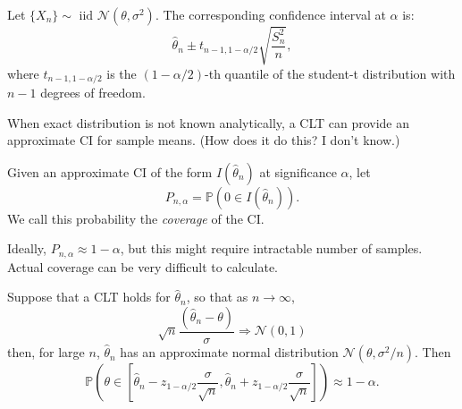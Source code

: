 \documentclass{article}
\newcommand\Prob[1]{\mathbb P(#1)}
\begin{document}
Let $\{X_n\} \sim \text{ iid } \mathcal N(\theta, \sigma^2)$. The
corresponding confidence interval at $\alpha$ is:
\[
    \hat\theta_n \pm t_{n-1,1-\alpha/2} \sqrt{\frac{S_n^2}{n}},
\]
where $t_{n-1,1-\alpha/2}$ is the $(1-\alpha/2)$-th quantile of the
student-t distribution with $n-1$ degrees of freedom.

When exact distribution is not known analytically, a CLT can provide an
approximate CI for sample means. (How does it do this? I don't know.)

Given an approximate CI of the form $I(\hat\theta_n)$ at significance
$\alpha$, let
\[
    P_{n,\alpha} = \Prob{0 \in I(\hat\theta_n)}.
\]
We call this probability the \emph{coverage} of the CI.

Ideally, $P_{n,\alpha} \approx 1 - \alpha$, but this might require
intractable number of samples. Actual coverage can be very difficult to
calculate.

Suppose that a CLT holds for $\hat\theta_n$, so that as $n\to\infty$,
\[
    \sqrt n \frac{(\hat\theta_n - \theta)}{\sigma} \Rightarrow \mathcal
    N(0,1)
\]
then, for large $n$, $\hat\theta_n$ has an approximate normal
distribution $\mathcal N(\theta, \sigma^2/n)$. Then
\[
    \Prob{
        \theta \in [\hat\theta_n - z_{1-\alpha/2} \frac{\sigma}{\sqrt n},
    \hat\theta_n + z_{1-\alpha/2} \frac{\sigma}{\sqrt n}]}
    \approx 1 - \alpha.
\]
\end{document}
